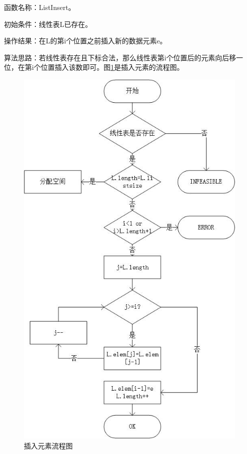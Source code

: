\documentclass[supercite]{Experimental_Report}
\theoremstyle{definition}
\begin{document}
函数名称：ListInsert。

初始条件：线性表L已存在。

操作结果：在L的第i个位置之前插入新的数据元素e。

算法思路：若线性表存在且下标合法，那么线性表第i个位置后的元素向后移一位，在第i个位置插入该数即可。图\ref{fig1-10}是插入元素的流程图。
\begin{figure}[htb] %
	\begin{center}
		\includegraphics[scale=0.9]{./images/顺序表/insert.jpg}
		\caption{插入元素流程图}
		\label{fig1-10}
	\end{center}
\end{figure}
\end{document}
